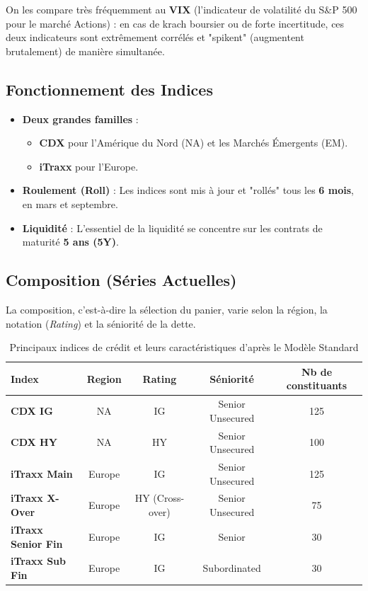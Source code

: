 On les compare très fréquemment au \textbf{VIX} (l'indicateur de volatilité du S\&P 500 pour le marché Actions) : en cas de krach boursier ou de forte incertitude, ces deux indicateurs sont extrêmement corrélés et "spikent" (augmentent brutalement) de manière simultanée.

\subsection{Fonctionnement des Indices}

\begin{itemize}
    \item \textbf{Deux grandes familles} :
    \begin{itemize}
        \item \textbf{CDX} pour l'Amérique du Nord (NA) et les Marchés Émergents (EM).
        \item \textbf{iTraxx} pour l'Europe.
    \end{itemize}
    \item \textbf{Roulement (Roll)} : Les indices sont mis à jour et "rollés" tous les \textbf{6 mois}, en mars et septembre.
    \item \textbf{Liquidité} : L'essentiel de la liquidité se concentre sur les contrats de maturité \textbf{5 ans (5Y)}.
\end{itemize}

\subsection{Composition (Séries Actuelles)}

La composition, c'est-à-dire la sélection du panier, varie selon la région, la notation (\textit{Rating}) et la séniorité de la dette.

\begin{table}[H]
    \centering
    \begin{tabular}{|l|c|c|c|c|}
        \hline
        \textbf{Index} & \textbf{Region} & \textbf{Rating} & \textbf{Séniorité} & \textbf{Nb de constituants} \\ \hline
        \textbf{CDX IG} & NA & IG & Senior Unsecured & 125 \\ \hline
        \textbf{CDX HY} & NA & HY & Senior Unsecured & 100 \\ \hline
        \textbf{iTraxx Main} & Europe & IG & Senior Unsecured & 125 \\ \hline
        \textbf{iTraxx X-Over} & Europe & HY (Cross-over) & Senior Unsecured & 75 \\ \hline
        \textbf{iTraxx Senior Fin} & Europe & IG & Senior & 30 \\ \hline
        \textbf{iTraxx Sub Fin} & Europe & IG & Subordinated & 30 \\ \hline
    \end{tabular}
    \caption{Principaux indices de crédit et leurs caractéristiques d'après le Modèle Standard}
\end{table}

